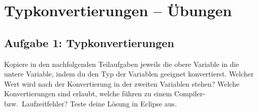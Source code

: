 \clearpage

\rehead[]{\textcolor{lightblue}{AvHG, Inf, My}}
\lohead[]{\textcolor{lightblue}{AvHG, Inf, My}}

\section{Typkonvertierungen -- Übungen}

\subsection{Aufgabe 1: Typkonvertierungen}

Kopiere in den nachfolgenden Teilaufgaben jeweils die obere Variable in die
untere Variable, indem du den Typ der Variablen geeignet konvertierst. Welcher
Wert wird nach der Konvertierung in der zweiten Variablen stehen? Welche
Konvertierungen sind erlaubt, welche führen zu einem Compiler- bzw.\
Laufzeitfehler? Teste deine Lösung in Eclipse aus.

